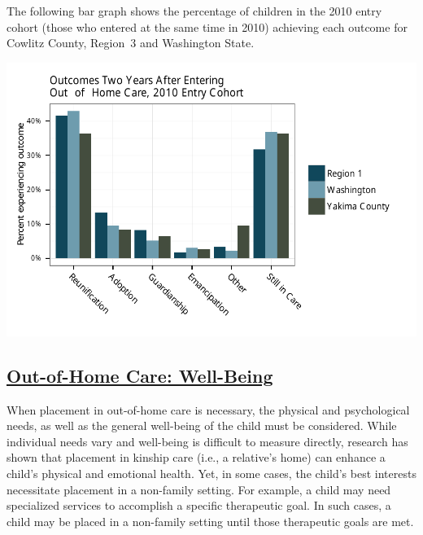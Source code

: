 \documentclass{article}\usepackage[]{graphicx}\usepackage[]{color}
\makeatletter
\def\maxwidth{ %
  \ifdim\Gin@nat@width>\linewidth
    \linewidth
  \else
    \Gin@nat@width
  \fi
}
\newenvironment{knitrout}{}{} %
\makeatother
\begin{document}
The following bar graph shows the percentage of children in the 2010 entry cohort (those who entered at the same time in 2010) achieving each outcome for Cowlitz County, Region~3 and Washington State.
\nopagebreak[3]
\begin{knitrout}
\color{fgcolor}

{\centering \includegraphics[width=\maxwidth]{figure/ooh_outcomes} 

}



\end{knitrout}


\newpage

\subsection{\href{http://www.partnersforourchildren.org/child-well-being/visualizations/out-home-care/well-being}
    {Out-of-Home Care: Well-Being}
}

When placement in out-of-home care is necessary, the physical and psychological needs, as well as the general well-being of the child must be considered. While individual needs vary and well-being is difficult to measure directly, research has shown that placement in kinship care (i.e., a relative's home) can enhance a child's physical and emotional health. Yet, in some cases, the child's best interests necessitate placement in a non-family setting. For example, a child may need specialized services to accomplish a specific therapeutic goal. In such cases, a child may be placed in a non-family setting until those therapeutic goals are met.
\end{document}
